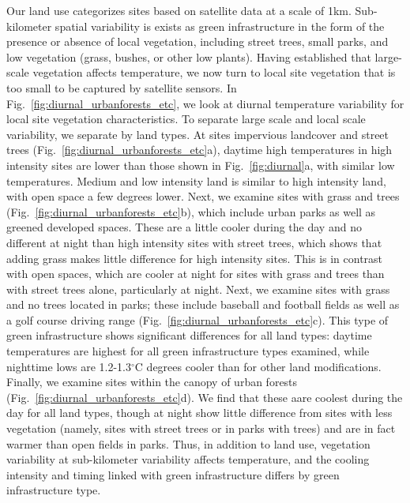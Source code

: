 \documentclass[draft,linenumbers]{agujournal}
\begin{document}
Our land use categorizes sites based on satellite data at a scale of 1km. Sub-kilometer spatial variability is exists as green infrastructure in the form of the presence or absence of local vegetation, including street trees, small parks, and low vegetation (grass, bushes, or other low plants). Having established that large-scale vegetation affects temperature, we now turn to local site vegetation that is too small to be captured by satellite sensors. In Fig.~\ref{fig:diurnal_urbanforests_etc}, we look at diurnal temperature variability for local site vegetation characteristics. To separate large scale and local scale variability, we separate by land types. At sites impervious landcover and street trees (Fig.~\ref{fig:diurnal_urbanforests_etc}a), daytime high temperatures in high intensity sites are lower than those shown in Fig.~\ref{fig:diurnal}a, with similar low temperatures. Medium and low intensity land is similar to high intensity land, with open space a few degrees lower. Next, we examine sites with grass and trees (Fig.~\ref{fig:diurnal_urbanforests_etc}b), which include urban parks as well as greened developed spaces. These are a little cooler during the day and no different at night than high intensity sites with street trees, which shows that adding grass makes little difference for high intensity sites. This is in contrast with open spaces, which are cooler at night for sites with grass and trees than with street trees alone, particularly at night. Next, we examine sites with grass and no trees located in parks; these include baseball and football fields as well as a golf course driving range (Fig.~\ref{fig:diurnal_urbanforests_etc}c). This type of green infrastructure shows significant differences for all land types: daytime temperatures are highest for all green infrastructure types examined, while nighttime lows are 1.2-1.3$^\circ$C degrees cooler than for other land modifications. Finally, we examine sites within the canopy of urban forests (Fig.~\ref{fig:diurnal_urbanforests_etc}d). We find that these aare coolest during the day for all land types, though at night show little difference from sites with less vegetation (namely, sites with street trees or in parks with trees) and are in fact warmer than open fields in parks. 
Thus, in addition to land use, vegetation variability at sub-kilometer variability affects temperature, and the cooling intensity and timing linked with green infrastructure differs by green infrastructure type. 
\end{document}
